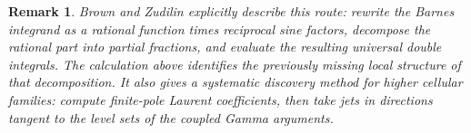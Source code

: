 \documentclass[11pt]{article}
\newtheorem{remark}{Remark}
\begin{document}
\begin{remark}
Brown and Zudilin explicitly describe this route: rewrite the Barnes
integrand as a rational function times reciprocal sine factors, decompose the
rational part into partial fractions, and evaluate the resulting universal
double integrals.  The calculation above identifies the previously missing
local structure of that decomposition.  It also gives a systematic discovery
method for higher cellular families: compute finite-pole Laurent coefficients,
then take jets in directions tangent to the level sets of the coupled Gamma
arguments.
\end{remark}
\end{document}
